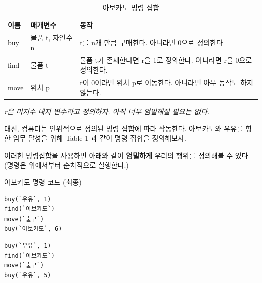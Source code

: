 \documentclass[a4paper,12pt]{book}
\begin{document}
\begin{table}[!h]
    \centering

    \caption{아보카도 명령 집합}
    \label{Tab:avocado-isa}

    \begin{tabular}{ || m{2em} | m{3.8em} | m{22em} || }
        \hline
        이름 & 매개변수 & 동작 \\
        \hline\hline
        buy & 물품 t, 자연수 n & t를 n개 만큼 구매한다. 아니라면 0으로 정의한다 \\
        \hline
        find & 물품 t & 물품 t가 존재한다면 r을 1로 정의한다. 아니라면 r을 0으로 정의한다. \\
        \hline
        move & 위치 p & r이 0이라면 위치 p로 이동한다. 아니라면 아무 동작도 하지 않는다. \\
        \hline
    \end{tabular}
    \newline
    \textit{\color{gray} \small r은 미지수 내지 변수라고 정의하자.
    아직 너무 엄밀해질 필요는 없다.}
\end{table}

대신, 컴퓨터는 인위적으로 정의된 명령 집합에 따라 작동한다. 아보카도와
우유를 향한 임무 달성을 위해 Table \ref{Tab:avocado-isa} 과 같이 명령
집합을 정의해보자.

이러한 명령집합을 사용하면 아래와 같이 \textbf{엄밀하게} 우리의 행위를
정의해볼 수 있다. (명령은 위에서부터 순차적으로 실행한다.)

\begin{center}

    \centering

    아보카도 명령 코드 (최종)

    \begin{minipage}{0.45\textwidth}
        \begin{lstlisting}[escapeinside=``]
buy(`우유`, 1)
find(`아보카도`)
move(`출구`)
buy(`아보카도`, 6)
        \end{lstlisting}
    \end{minipage}
    \hfill
    \begin{minipage}{0.45\textwidth}
        \begin{lstlisting}[escapeinside=``]
buy(`우유`, 1)
find(`아보카도`)
move(`출구`)
buy(`우유`, 5)
        \end{lstlisting}
    \end{minipage}

\end{center}
\end{document}
